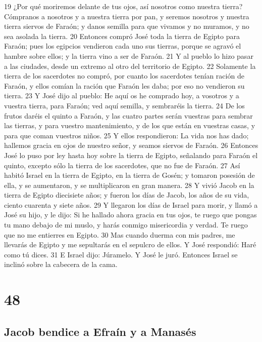 19 ¿Por qué moriremos delante de tus ojos, así nosotros como nuestra tierra? Cómpranos a nosotros y a nuestra tierra por pan, y seremos nosotros y nuestra tierra siervos de Faraón; y danos semilla para que vivamos y no muramos, y no sea asolada la tierra.
20 Entonces compró José toda la tierra de Egipto para Faraón; pues los egipcios vendieron cada uno sus tierras, porque se agravó el hambre sobre ellos; y la tierra vino a ser de Faraón.
21 Y al pueblo lo hizo pasar a las ciudades, desde un extremo al otro del territorio de Egipto.
22 Solamente la tierra de los sacerdotes no compró, por cuanto los sacerdotes tenían ración de Faraón, y ellos comían la ración que Faraón les daba; por eso no vendieron su tierra.
23 Y José dijo al pueblo: He aquí os he comprado hoy, a vosotros y a vuestra tierra, para Faraón; ved aquí semilla, y sembraréis la tierra.
24 De los frutos daréis el quinto a Faraón, y las cuatro partes serán vuestras para sembrar las tierras, y para vuestro mantenimiento, y de los que están en vuestras casas, y para que coman vuestros niños.
25 Y ellos respondieron: La vida nos has dado; hallemos gracia en ojos de nuestro señor, y seamos siervos de Faraón.
26 Entonces José lo puso por ley hasta hoy sobre la tierra de Egipto, señalando para Faraón el quinto, excepto sólo la tierra de los sacerdotes, que no fue de Faraón.
27 Así habitó Israel en la tierra de Egipto, en la tierra de Gosén; y tomaron posesión de ella, y se aumentaron, y se multiplicaron en gran manera.
28 Y vivió Jacob en la tierra de Egipto diecisiete años; y fueron los días de Jacob, los años de su vida, ciento cuarenta y siete años.
29 Y llegaron los días de Israel para morir, y llamó a José su hijo, y le dijo: Si he hallado ahora gracia en tus ojos, te ruego que pongas tu mano debajo de mi muslo, y harás conmigo misericordia y verdad. Te ruego que no me entierres en Egipto.
30 Mas cuando duerma con mis padres, me llevarás de Egipto y me sepultarás en el sepulcro de ellos. Y José respondió: Haré como tú dices.
31 E Israel dijo: Júramelo. Y José le juró. Entonces Israel se inclinó sobre la cabecera de la cama.

\chapter{48}

\section*{Jacob bendice a Efraín y a Manasés}

